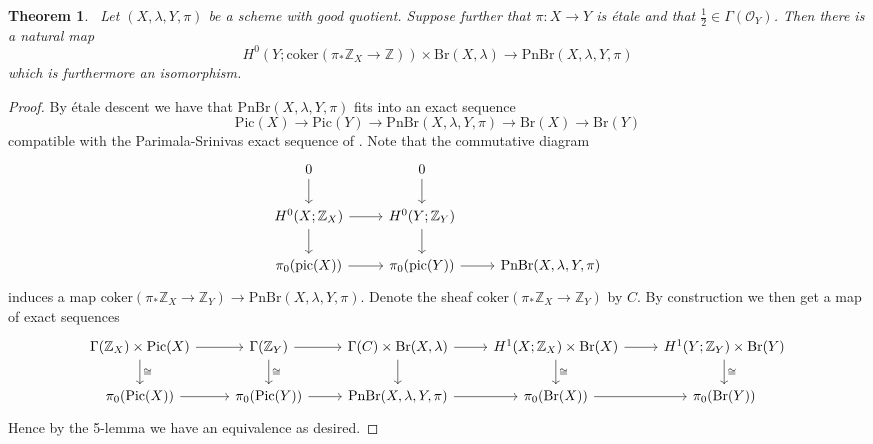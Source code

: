 \documentclass{article}
\newcommand{\pnbr}{\ensuremath{\mathrm{PnBr}}}
\newcommand{\pic}{\ensuremath{\mathrm{Pic}}}
\newcommand{\br}{\ensuremath{\mathrm{Br}}}
\newtheorem{theorem}[equation]{Theorem}
\theoremstyle{definition}
\newcommand{\Lucyil}[1]{\todo[color=cyan!30,inline]{\linespread{1}\footnotesize L: #1}}
\begin{document}
\begin{theorem}~\label{thm: PS comparison in text}
    Let $(X,\lambda,Y,\pi)$ be a scheme with good quotient. Suppose further that $\pi:X\to Y$ is \'etale and that $\frac{1}{2}\in \Gamma(\mathcal{O}_Y)$. Then there is a natural map \[H^{0}(Y;\mathrm{coker}(\pi_*\mathbb{Z}_X\to \mathbb{Z}))\times\mathrm{Br}(X,\lambda)\to \pnbr(X,\lambda,Y,\pi)\] which is furthermore an isomorphism.
\end{theorem}
\begin{proof}
    By \'etale descent we have that $\pnbr(X,\lambda,Y,\pi)$ fits into an exact sequence \[\pic(X)\to \pic(Y)\to \pnbr(X,\lambda,Y,\pi)\to \mathrm{Br}(X)\to \mathrm{Br}(Y)\] compatible with the Parimala-Srinivas exact sequence of \cite[Theorem 1.2]{MR1162189}. Note that the commutative diagram 
    \[\begin{tikzcd}
        0\ar[d] & 0\ar[d] & \\
        H^0(X;\mathbb{Z}_X)\ar[d] \ar[r] & H^0(Y;\mathbb{Z}_Y)\ar[d] & \\
        \pi_0(\mathrm{pic}(X)) \ar[r] & \pi_0(\mathrm{pic}(Y)) \ar[r] & \pnbr(X,\lambda, Y ,\pi) 
    \end{tikzcd}\]
    induces a map $\mathrm{coker}(\pi_*\mathbb{Z}_X\to \mathbb{Z}_Y)\to \pnbr(X,\lambda, Y, \pi)$. Denote the sheaf $\mathrm{coker}(\pi_* \mathbb{Z}_X\to \mathbb{Z}_Y)$ by $C$. By construction we then get a map of exact sequences \[
    \begin{tikzcd}
        \Gamma(\mathbb{Z}_X)\times \pic(X) \ar[r] \ar[d,"\cong"] & \Gamma(\mathbb{Z}_Y) \ar[r] \ar[d,"\cong"] & \Gamma(C)\times \mathrm{Br}(X,\lambda) \ar[r] \ar[d] & H^1(X;\mathbb{Z}_X)\times \mathrm{Br}(X)\ar[r] \ar[d,"\cong"] & H^1(Y;\mathbb{Z}_Y)\times \mathrm{Br}(Y)\ar[d,"\cong"]\\
        \pi_0(\pic(X)) \ar[r] & \pi_0(\pic(Y))\ar[r] & \pnbr(X,\lambda, Y,\pi) \ar[r] & \pi_0(\br(X)) \ar[r] & \pi_0(\br(Y))
    \end{tikzcd}
    \]
    Hence by the 5-lemma we have an equivalence as desired.
\end{proof}
\end{document}
